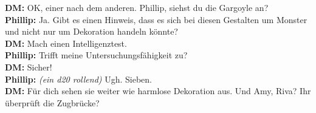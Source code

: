 \begin{quotebox}
\textbf{DM:} OK, einer nach dem anderen. Phillip, siehst du die Gargoyle an?\\
\textbf{Phillip:}
Ja. Gibt es einen Hinweis, dass es sich bei diesen Gestalten um Monster und nicht nur um Dekoration handeln könnte?\\
\textbf{DM:}
Mach einen Intelligenztest.\\
\textbf{Phillip:}
Trifft meine Untersuchungsfähigkeit zu?\\
\textbf{DM:}
Sicher!\\
\textbf{Phillip:} \textit{(ein d20 rollend)}
Ugh. Sieben.\\
\textbf{DM:}
Für dich sehen sie weiter wie harmlose Dekoration aus. Und Amy, Riva? Ihr überprüft die Zugbrücke?
\end{quotebox}

